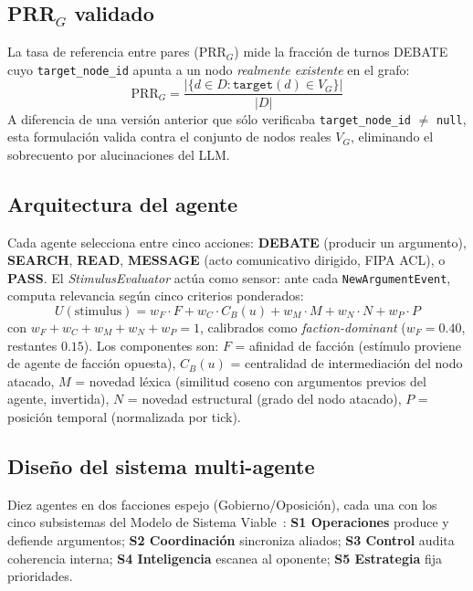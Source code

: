 \documentclass{llncs}
\begin{document}
\subsection{PRR$_G$ validado}
\label{sec:prrg}

La tasa de referencia entre pares (PRR$_G$) mide la fracci\'on de turnos
DEBATE cuyo \texttt{target\_node\_id} apunta a un nodo \emph{realmente
existente} en el grafo:
\begin{equation}
    \mathrm{PRR}_G = \frac{|\{d \in D : \texttt{target}(d) \in V_G\}|}{|D|}
    \label{eq:prrg}
\end{equation}
A diferencia de una versi\'on anterior que s\'olo verificaba
\texttt{target\_node\_id} $\neq$ \texttt{null}, esta formulaci\'on
valida contra el conjunto de nodos reales $V_G$, eliminando el
sobrecuento por alucinaciones del LLM.

\subsection{Arquitectura del agente}

Cada agente selecciona entre cinco acciones: \textbf{DEBATE} (producir
un argumento), \textbf{SEARCH}, \textbf{READ}, \textbf{MESSAGE} (acto
comunicativo dirigido, FIPA ACL), o \textbf{PASS}. El
\emph{StimulusEvaluator} act\'ua como sensor: ante cada
\texttt{NewArgumentEvent}, computa relevancia seg\'un cinco criterios
ponderados:
\begin{equation}
    U(\text{stimulus}) = w_F \cdot F + w_C \cdot C_B(u) + w_M \cdot M
        + w_N \cdot N + w_P \cdot P
    \label{eq:stimulus}
\end{equation}
con $w_F + w_C + w_M + w_N + w_P = 1$, calibrados como
\emph{faction-dominant} ($w_F{=}0.40$, restantes $0.15$). Los componentes
son: $F$ = afinidad de facci\'on (est\'imulo proviene de agente de facci\'on
opuesta), $C_B(u)$ = centralidad de intermediaci\'on del nodo atacado,
$M$ = novedad l\'exica (similitud coseno con argumentos previos del agente,
invertida), $N$ = novedad estructural (grado del nodo atacado), $P$ =
posici\'on temporal (normalizada por tick).

\subsection{Dise\~no del sistema multi-agente}

Diez agentes en dos facciones espejo (Gobierno/Oposici\'on), cada una
con los cinco subsistemas del Modelo de Sistema
Viable~\parencite{beer1972brain}: \textbf{S1 Operaciones} produce y
defiende argumentos; \textbf{S2 Coordinaci\'on} sincroniza aliados;
\textbf{S3 Control} audita coherencia interna; \textbf{S4 Inteligencia}
escanea al oponente; \textbf{S5 Estrategia} fija prioridades.
\end{document}
